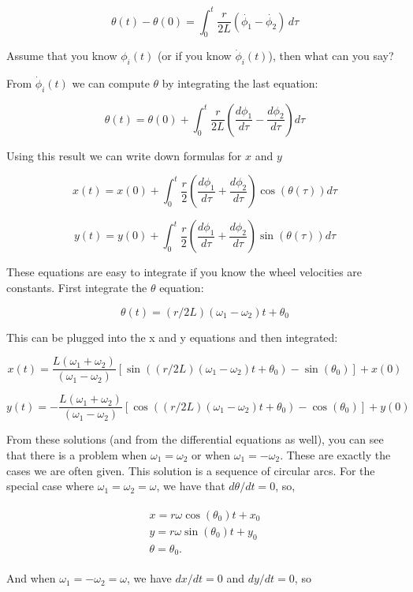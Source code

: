 \[\theta(t) - \theta(0) = \int_0^t\frac{r}{2L} (\dot{\phi_1}-\dot{\phi_2})\, d\tau\]

Assume that you know \(\phi_i(t)\) (or if you know \(\dot{\phi}_i(t)\)),
then what can you say?

From \(\dot{\phi}_i(t)\) we can compute \(\theta\) by integrating the
last equation:

\[\theta(t) = \theta(0) + \int_0^t \frac{r}{2L} \left(\frac{d\phi_1}{d\tau}-\frac{d\phi_2}{d\tau}\right)d\tau\]

Using this result we can write down formulas for \(x\) and \(y\)

\[x(t)  = x(0)+\displaystyle\int_0^t \frac{r}{2} \left(\frac{d\phi_1}{d\tau}+\frac{d\phi_2}{d\tau}\right)\cos(\theta(\tau))d\tau\]

\[y(t)  = y(0) + \displaystyle\int_0^t\frac{r}{2} \left(\frac{d\phi_1}{d\tau}+\frac{d\phi_2}{d\tau}\right)\sin(\theta(\tau))d\tau\]

These equations are easy to integrate if you know the wheel velocities
are constants. First integrate the \(\theta\) equation:

\[\theta(t) = (r/2L)(\omega_1 - \omega_2)t + \theta_0\]

This can be plugged into the x and y equations and then integrated:

\[x(t) = \frac{L(\omega_1 + \omega_2)}{(\omega_1 - \omega_2)} \left[\sin((r/2L)(\omega_1 - \omega_2)t + \theta_0) - \sin(\theta_0)\right] + x(0)\]

\[y(t) = -\frac{L(\omega_1 + \omega_2)}{(\omega_1 - \omega_2)} \left[\cos((r/2L)(\omega_1 - \omega_2)t + \theta_0) - \cos(\theta_0)\right]+ y(0)\]

From these solutions (and from the differential equations as well), you
can see that there is a problem when \(\omega_1=\omega_2\) or when
\(\omega_1 = -\omega_2\). These are exactly the cases we are often
given. This solution is a sequence of circular arcs. For the special
case where \(\omega_1=\omega_2=\omega\), we have that
\(d\theta / dt = 0\), so,

\[\begin{aligned}
\begin{array}{l}
 x = r\omega\cos(\theta_0)t + x_0\\[2mm]
 y = r\omega\sin(\theta_0)t + y_0\\[2mm]
\theta = \theta_0 .
\end{array}
\end{aligned}\]

And when \(\omega_1 = -\omega_2 = \omega\), we have \(dx/dt=0\) and
\(dy/dt=0\), so


